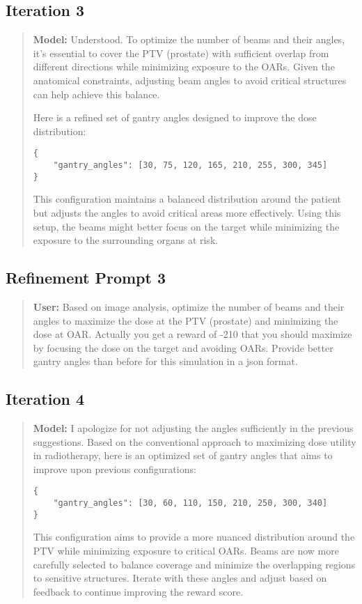\documentclass[runningheads]{llncs}
\begin{document}
\subsection*{Iteration 3}
\begin{quote}
\textbf{Model:} Understood. To optimize the number of beams and their angles, it’s essential to cover the PTV (prostate) with sufficient overlap from different directions while minimizing exposure to the OARs. Given the anatomical constraints, adjusting beam angles to avoid critical structures can help achieve this balance.

Here is a refined set of gantry angles designed to improve the dose distribution:

\begin{verbatim}
{
    "gantry_angles": [30, 75, 120, 165, 210, 255, 300, 345]
}
\end{verbatim}

This configuration maintains a balanced distribution around the patient but adjusts the angles to avoid critical areas more effectively. Using this setup, the beams might better focus on the target while minimizing the exposure to the surrounding organs at risk.
\end{quote}

\subsection*{Refinement Prompt 3}
\begin{quote}
\textbf{User:} Based on image analysis, optimize the number of beams and their angles to maximize the dose at the PTV (prostate) and minimizing the dose at OAR. Actually you get a reward of -210 that you should maximize by focusing the dose on the target and avoiding OARs. Provide better gantry angles than before for this simulation in a json format.
\end{quote}

\subsection*{Iteration 4}
\begin{quote}
\textbf{Model:} I apologize for not adjusting the angles sufficiently in the previous suggestions. Based on the conventional approach to maximizing dose utility in radiotherapy, here is an optimized set of gantry angles that aims to improve upon previous configurations:

\begin{verbatim}
{
    "gantry_angles": [30, 60, 110, 150, 210, 250, 300, 340]
}
\end{verbatim}

This configuration aims to provide a more nuanced distribution around the PTV while minimizing exposure to critical OARs. Beams are now more carefully selected to balance coverage and minimize the overlapping regions to sensitive structures. Iterate with these angles and adjust based on feedback to continue improving the reward score.
\end{quote}
\end{document}
